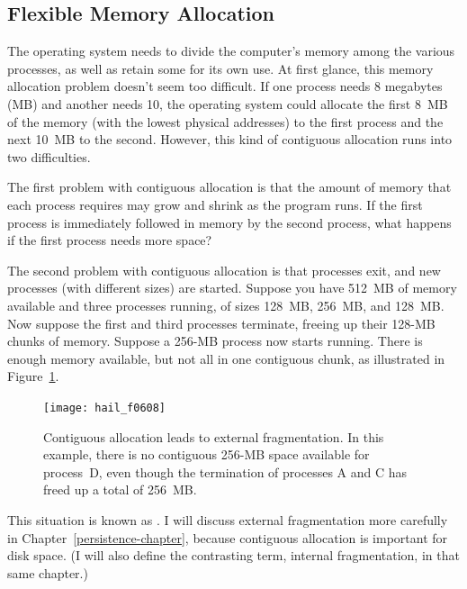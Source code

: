 \subsection{Flexible Memory Allocation}

The operating system needs to divide the computer's memory among
the various processes, as well as retain some for its own use.
At first glance, this memory allocation problem doesn't seem too
difficult.  If one process needs 8 megabytes (MB) and another needs
10, the operating system could allocate the first 8~MB of
the memory (with the lowest physical addresses) to the first process
and the next 10~MB to the second.  However, this kind of
contiguous allocation runs into two difficulties.

The first problem with contiguous allocation is that the amount of
memory that each process requires may grow and shrink as the program
runs.  If the first process is immediately followed in memory by the
second process, what happens if the first process needs more space?

The second problem with contiguous allocation is that processes exit,
and new processes (with different sizes) are started.  Suppose you have
512~MB of memory available and three processes running, of sizes
128~MB, 256~MB, and 128~MB.  Now suppose the first and third processes
terminate, freeing up their 128-MB chunks of memory.  Suppose a 256-MB
process now starts running.  There is enough memory available, but not
all in one contiguous chunk, as illustrated in Figure~\ref{scan-6-6}.
\begin{figure}
\centerline{\texttt{[image: hail\_f0608]}}
\caption{Contiguous allocation leads to external fragmentation.  In
  this example, there is no contiguous 256-MB space available for
  process~D, even though the termination of processes A and C has
  freed up a total of 256~MB.}
\label{scan-6-6}
\end{figure}
This situation is known as .  I
will discuss external fragmentation more carefully in
Chapter~\ref{persistence-chapter}, because contiguous allocation is
important for disk space.  (I will also define the contrasting term,
internal fragmentation, in that same chapter.)

